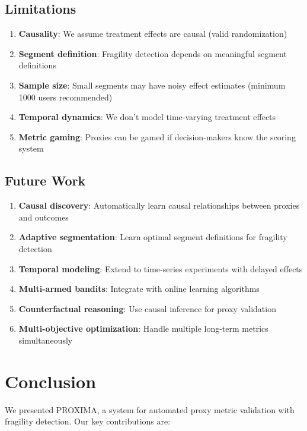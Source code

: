 \documentclass[11pt,twocolumn]{article}
\begin{document}
\subsection{Limitations}

\begin{enumerate}
    \item \textbf{Causality}: We assume treatment effects are causal (valid randomization)
    \item \textbf{Segment definition}: Fragility detection depends on meaningful segment definitions
    \item \textbf{Sample size}: Small segments may have noisy effect estimates (minimum 1000 users recommended)
    \item \textbf{Temporal dynamics}: We don't model time-varying treatment effects
    \item \textbf{Metric gaming}: Proxies can be gamed if decision-makers know the scoring system
\end{enumerate}

\subsection{Future Work}

\begin{enumerate}
    \item \textbf{Causal discovery}: Automatically learn causal relationships between proxies and outcomes
    \item \textbf{Adaptive segmentation}: Learn optimal segment definitions for fragility detection
    \item \textbf{Temporal modeling}: Extend to time-series experiments with delayed effects
    \item \textbf{Multi-armed bandits}: Integrate with online learning algorithms
    \item \textbf{Counterfactual reasoning}: Use causal inference for proxy validation
    \item \textbf{Multi-objective optimization}: Handle multiple long-term metrics simultaneously
\end{enumerate}

\section{Conclusion}

We presented PROXIMA, a system for automated proxy metric validation with fragility detection. Our key contributions are:
\end{document}
